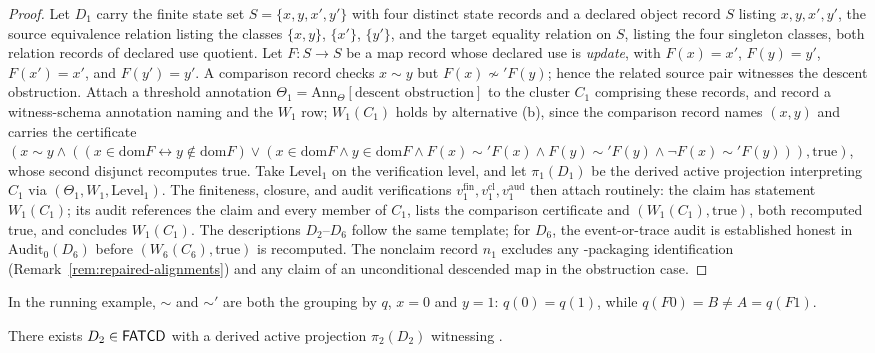 \begin{proof}
Let \(D_1\) carry the finite state set \(S=\{x,y,x',y'\}\) with four distinct
state records and a declared object record \(S\) listing \(x,y,x',y'\), the source equivalence relation listing the classes \(\{x,y\}\), \(\{x'\}\), \(\{y'\}\), and the target equality relation on \(S\), listing the four singleton classes, both relation records
of declared use quotient. Let \(F:S\to S\) be a
map record whose declared use is \emph{update}, with \(F(x)=x'\),
\(F(y)=y'\), \(F(x')=x'\), and \(F(y')=y'\). A comparison record checks
\(x\sim y\) but \(F(x)\not\sim'F(y)\); hence the related source pair witnesses
the descent obstruction. Attach a threshold annotation
\(\Theta_1 = \mathrm{Ann}_\Theta[\text{descent obstruction}]\) to the
cluster \(C_1\) comprising these records, and record a witness-schema annotation naming \Pone{} and the \(W_1\) row;
\(W_1(C_1)\) holds by alternative (b), since the comparison record names
\((x,y)\) and carries the certificate
\((x\sim y\wedge((x\in\mathrm{dom}F\leftrightarrow y\notin\mathrm{dom}F)\vee(x\in\mathrm{dom}F\wedge y\in\mathrm{dom}F\wedge F(x)\sim'F(x)\wedge F(y)\sim'F(y)\wedge\neg F(x)\sim'F(y))),\mathrm{true})\),
whose second disjunct recomputes true. Take \(\mathrm{Level}_1\) on the verification
level, and let \(\pi_1(D_1)\) be the derived active projection
interpreting \(C_1\) via \((\Theta_1,W_1,\mathrm{Level}_1)\). The
finiteness, closure, and audit verifications \(v_1^{\mathrm{fin}},
v_1^{\mathrm{cl}}, v_1^{\mathrm{aud}}\) then attach routinely: the claim has
statement \(W_1(C_1)\); its audit references the claim and every member of \(C_1\), lists the comparison certificate and
\((W_1(C_1),\mathrm{true})\), both recomputed true, and concludes \(W_1(C_1)\).
The descriptions \(D_2\)--\(D_6\) follow the same template; for \(D_6\), the
event-or-trace audit is established honest in \(\mathrm{Audit}_0(D_6)\) before
\((W_6(C_6),\mathrm{true})\) is recomputed. The
nonclaim record \(n_1\) excludes any \Pfive{}-packaging
identification (Remark~\ref{rem:repaired-alignments}) and any claim of
an unconditional descended map in the obstruction case.
\end{proof}

In the running example, \(\sim\) and \(\sim'\) are both the grouping by
\(q\), \(x=0\) and \(y=1\): \(q(0)=q(1)\), while \(q(F0)=B\neq A=q(F1)\).

\begin{proposition}\label{prop:p2-witness}
There exists \(D_2 \in \mathsf{FATCD}{}\) with a derived active projection
\(\pi_2(D_2)\) witnessing \Ptwo{}.
\end{proposition}

